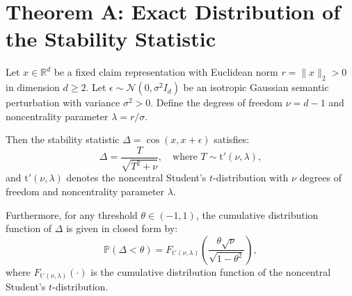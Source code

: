 \section{Theorem A: Exact Distribution of the Stability Statistic}
\label{sec:thmA}

\begin{theorem}
\label{thm:exact_distribution}
Let $x \in \mathbb{R}^d$ be a fixed claim representation with Euclidean norm $r = \|x\|_2 > 0$ in dimension $d \ge 2$. Let $\epsilon \sim \mathcal{N}(0, \sigma^2 I_d)$ be an isotropic Gaussian semantic perturbation with variance $\sigma^2 > 0$. Define the degrees of freedom $\nu = d - 1$ and noncentrality parameter $\lambda = r / \sigma$. 

Then the stability statistic $\Delta = \cos(x, x + \epsilon)$ satisfies:
\begin{equation}
\label{eq:delta_noncentral_t}
\Delta = \frac{T}{\sqrt{T^2 + \nu}}, \quad \text{where } T \sim \mathrm{t}'(\nu, \lambda),
\end{equation}
and $\mathrm{t}'(\nu, \lambda)$ denotes the noncentral Student's $t$-distribution with $\nu$ degrees of freedom and noncentrality parameter $\lambda$.

Furthermore, for any threshold $\theta \in (-1, 1)$, the cumulative distribution function of $\Delta$ is given in closed form by:
\begin{equation}
\label{eq:delta_cdf}
\mathbb{P}(\Delta < \theta) = F_{\mathrm{t}'(\nu, \lambda)}\left( \frac{\theta \sqrt{\nu}}{\sqrt{1 - \theta^2}} \right),
\end{equation}
where $F_{\mathrm{t}'(\nu, \lambda)}(\cdot)$ is the cumulative distribution function of the noncentral Student's $t$-distribution.
\end{theorem}

